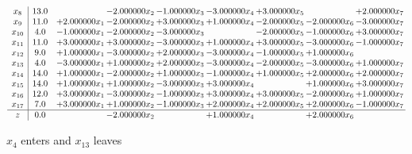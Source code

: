 \documentclass[10pt]{article}
\begin{document}
\[\begin{array}{c| c c@{\hskip 2pt} c@{\hskip 2pt} c@{\hskip 2pt} c@{\hskip 2pt} c@{\hskip 2pt} c@{\hskip 2pt} c@{\hskip 2pt} }
 x_{8}   &  13.0  &   & -2.000000 x_{2} & -1.000000 x_{3} & -3.000000 x_{4} & + 3.000000 x_{5} &   & + 2.000000 x_{7}\\
 x_{9}   &  11.0 & + 2.000000 x_{1} & -2.000000 x_{2} & + 3.000000 x_{3} & + 1.000000 x_{4} & -2.000000 x_{5} & -2.000000 x_{6} & -3.000000 x_{7}\\
 x_{10}   &  4.0 & -1.000000 x_{1} & -2.000000 x_{2} & -3.000000 x_{3} &   & -2.000000 x_{5} & -1.000000 x_{6} & + 3.000000 x_{7}\\
 x_{11}   &  11.0 & + 3.000000 x_{1} & + 3.000000 x_{2} & -3.000000 x_{3} & + 1.000000 x_{4} & + 3.000000 x_{5} & -3.000000 x_{6} & -1.000000 x_{7}\\
 x_{12}   &  9.0 & + 1.000000 x_{1} & -3.000000 x_{2} & + 2.000000 x_{3} & -3.000000 x_{4} & -1.000000 x_{5} & + 1.000000 x_{6} &   \\
 x_{13}   &  4.0 & -3.000000 x_{1} & + 1.000000 x_{2} & + 2.000000 x_{3} & -3.000000 x_{4} & -2.000000 x_{5} & -3.000000 x_{6} & + 1.000000 x_{7}\\
 x_{14}   &  14.0 & + 1.000000 x_{1} & -2.000000 x_{2} & + 1.000000 x_{3} & -1.000000 x_{4} & + 1.000000 x_{5} & + 2.000000 x_{6} & + 2.000000 x_{7}\\
 x_{15}   &  14.0 & + 1.000000 x_{1} & + 1.000000 x_{2} & -3.000000 x_{3} & + 3.000000 x_{4} &   & + 1.000000 x_{6} & + 3.000000 x_{7}\\
 x_{16}   &  12.0 & + 3.000000 x_{1} & -3.000000 x_{2} & -1.000000 x_{3} & + 3.000000 x_{4} & + 3.000000 x_{5} & -2.000000 x_{6} & + 1.000000 x_{7}\\
 x_{17}   &  7.0 & + 3.000000 x_{1} & + 1.000000 x_{2} & -1.000000 x_{3} & + 2.000000 x_{4} & + 2.000000 x_{5} & + 2.000000 x_{6} & -1.000000 x_{7}\\
\hline
z    &  0.0  &   & -2.000000 x_{2} &   & + 1.000000 x_{4} &   & + 2.000000 x_{6} &   \\
\end{array}\]


 $ x_{4} $ enters and $ x_{13} $ leaves 
\end{document}
